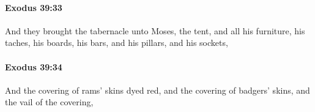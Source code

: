 		\paragraph{Exodus 39:33} %
			\label{EXODUS-39-33}

			And they brought the tabernacle unto Moses, the tent, and all his furniture, his taches, his boards, his bars, and his pillars, and his sockets,


		\paragraph{Exodus 39:34} %
			\label{EXODUS-39-34}

			And the covering of rams' skins dyed red, and the covering of badgers' skins, and the vail of the covering,


